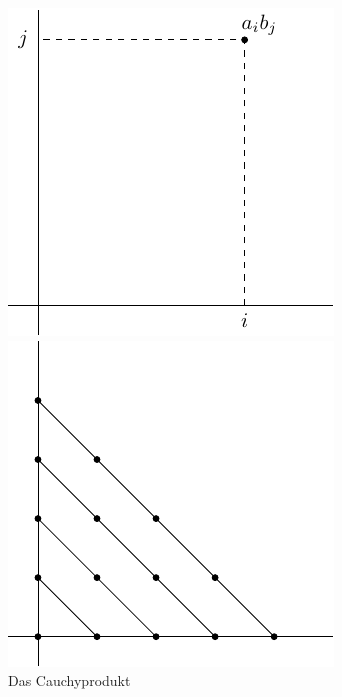 \documentclass[../main.tex]{subfiles}
\begin{document}
\begin{figure}[htb] 
  \centering
  \begin{minipage}{0.50\textwidth}
    \centering
\includegraphics{chapter2/images/cauchy1}
  \end{minipage}%
  \begin{minipage}{0.50\textwidth}
    \centering
    \includegraphics{chapter2/images/cauchy2}
  \end{minipage}%
  \caption{Das Cauchyprodukt}%
  \label{fig:cauchy}
\end{figure}
\end{document}
